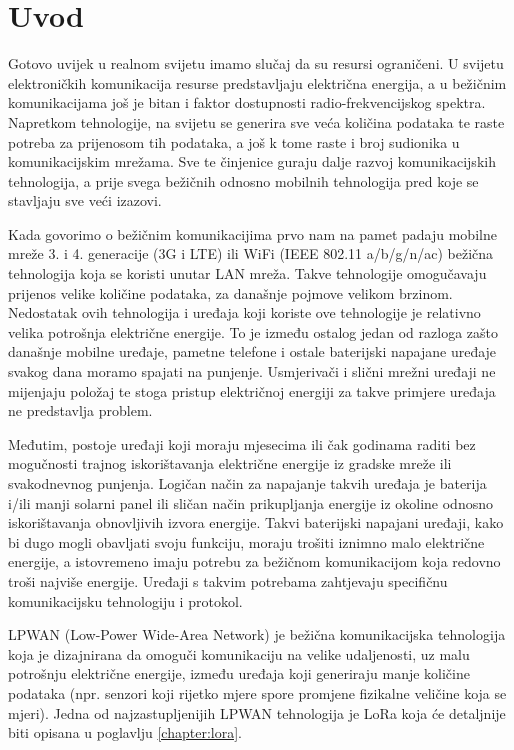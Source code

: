 \chapter{Uvod}
\label{chapter:uvod}
Gotovo uvijek u realnom svijetu imamo slučaj da su resursi ograničeni. U svijetu elektroničkih komunikacija resurse predstavljaju električna energija, a u bežičnim komunikacijama još je bitan i faktor dostupnosti radio-frekvencijskog spektra. Napretkom tehnologije, na svijetu se generira sve veća količina podataka te raste potreba za prijenosom tih podataka, a još k tome raste i broj sudionika u komunikacijskim mrežama. Sve te činjenice guraju dalje razvoj komunikacijskih tehnologija, a prije svega bežičnih odnosno mobilnih tehnologija pred koje se stavljaju sve veći izazovi.
\newline

Kada govorimo o bežičnim komunikacijima prvo nam na pamet padaju mobilne mreže 3. i 4. generacije (3G i LTE) ili WiFi (IEEE 802.11 a/b/g/n/ac) bežična tehnologija koja se koristi unutar LAN mreža. Takve tehnologije omogučavaju prijenos velike količine podataka, za današnje pojmove velikom brzinom. Nedostatak ovih tehnologija i uređaja koji koriste ove tehnologije je relativno velika potrošnja električne energije. To je između ostalog jedan od razloga zašto današnje mobilne uređaje, pametne telefone i ostale baterijski napajane uređaje svakog dana moramo spajati na punjenje. Usmjerivači i slični mrežni uređaji ne mijenjaju položaj te stoga pristup električnoj energiji za takve primjere uređaja ne predstavlja problem.
\newline

Međutim, postoje uređaji koji moraju mjesecima ili čak godinama raditi bez mogučnosti trajnog iskorištavanja električne energije iz gradske mreže ili svakodnevnog punjenja. Logičan način za napajanje takvih uređaja je baterija i/ili manji solarni panel ili sličan način prikupljanja energije iz okoline odnosno iskorištavanja obnovljivih izvora energije. Takvi baterijski napajani uređaji, kako bi dugo mogli obavljati svoju funkciju, moraju trošiti iznimno malo električne energije, a istovremeno imaju potrebu za bežičnom komunikacijom koja redovno troši najviše energije. Uređaji s takvim potrebama zahtjevaju specifičnu komunikacijsku tehnologiju i protokol.
\newline

LPWAN (Low-Power Wide-Area Network) je bežična komunikacijska tehnologija koja je dizajnirana da omoguči komunikaciju na velike udaljenosti, uz malu potrošnju električne energije, između uređaja koji generiraju manje količine podataka (npr. senzori koji rijetko mjere spore promjene fizikalne veličine koja se mjeri). Jedna od najzastupljenijih LPWAN tehnologija je LoRa koja će detaljnije biti opisana u poglavlju \ref{chapter:lora}.